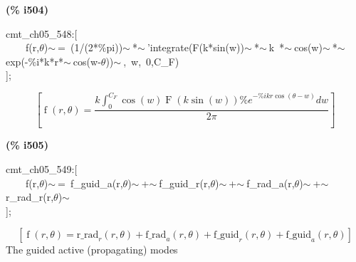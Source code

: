 \documentclass[fleqn]{article}
\begin{document}
\noindent
\begin{minipage}[t]{4.000000em}\color{red}\bfseries
(\% i504)	
\end{minipage}
\begin{minipage}[t]{\textwidth}\color{blue}
cmt\_ch05\_548:[\\
\ \ \ \ f(r,\ensuremath{\theta})\ensuremath{\sim\ }=\ (1/(2*\%pi))\ensuremath{\sim\ }*\ensuremath{\sim\ }'integrate(F(k*sin(w))\ensuremath{\sim\ }*\ensuremath{\sim\ }k\ *\ensuremath{\sim\ }cos(w)\ensuremath{\sim\ }*\ensuremath{\sim\ }exp(-\%i*k*r*\ensuremath{\sim\ }cos(w-\ensuremath{\theta}))\ensuremath{\sim\ },\ w,\ 0,C\_F)\\
];
\end{minipage}
\[\displaystyle \tag{\% o504} 
\left[ \operatorname{f}\left( r\operatorname{,}\theta \right) =\frac{k \int_{0}^{{C_F}}{\left. \cos{(w)} \operatorname{F}\left( k \sin{(w)}\right)  {{\% e}^{-\% i k r \cos{\left( \theta -w\right) }}}dw\right.}}{2 \ensuremath{\pi} }\right] \mbox{}
\]


\noindent
\begin{minipage}[t]{4.000000em}\color{red}\bfseries
(\% i505)	
\end{minipage}
\begin{minipage}[t]{\textwidth}\color{blue}
cmt\_ch05\_549:[\\
\ \ \ \ f(r,\ensuremath{\theta})\ensuremath{\sim\ }=\ f\_guid\_a(r,\ensuremath{\theta})\ensuremath{\sim\ }+\ensuremath{\sim\ }f\_guid\_r(r,\ensuremath{\theta})\ensuremath{\sim\ }+\ensuremath{\sim\ }f\_rad\_a(r,\ensuremath{\theta})\ensuremath{\sim\ }+\ensuremath{\sim\ }r\_rad\_r(r,\ensuremath{\theta})\ensuremath{\sim\ }\\
];
\end{minipage}
\[\displaystyle \tag{\% o505} 
\left[ \operatorname{f}\left( r\operatorname{,}\theta \right) ={{\ensuremath{\mathrm{r\_ rad}}}_r}\left( r\operatorname{,}\theta \right) +{{\ensuremath{\mathrm{f\_ rad}}}_a}\left( r\operatorname{,}\theta \right) +{{\ensuremath{\mathrm{f\_ guid}}}_r}\left( r\operatorname{,}\theta \right) +{{\ensuremath{\mathrm{f\_ guid}}}_a}\left( r\operatorname{,}\theta \right) \right] \mbox{}
\]
The guided active (propagating) modes
\end{document}
